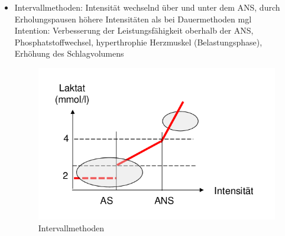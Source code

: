\begin{itemize}
\begin{itemize}
\begin{figure}[H]
\begin{subfigure}[b]{0.4\textwidth}
            \caption{Dauertraining intensiv}
          \end{subfigure}
        \end{figure}
      \item Intensiv: Intensität knapp unterhalb der ANS, Dauer \& Intensität hoch ($\leq$ ED)\\
        Intention: Rechtsverschiebung der ANS, Verbesserung des Glykose- und Laktatabbaus, Laktattoleranz (``MENTALE HÄRTE BITCH'')
    \end{itemize}
  \item Intervallmethoden: Intensität wechselnd über und unter dem ANS, durch Erholungspausen höhere Intensitäten als bei Dauermethoden mgl \\
    Intention: Verbesserung der Leistungsfähigkeit oberhalb der ANS, Phosphatstoffwechsel, hyperthrophie Herzmuskel (Belastungsphase), Erhöhung des Schlagvolumens
    \begin{figure}[H]
      \centering
      \includegraphics[width=.5\textwidth]{pictures/intervalltraining.png}
      \caption{Intervallmethoden}
    \end{figure}
\end{itemize}
